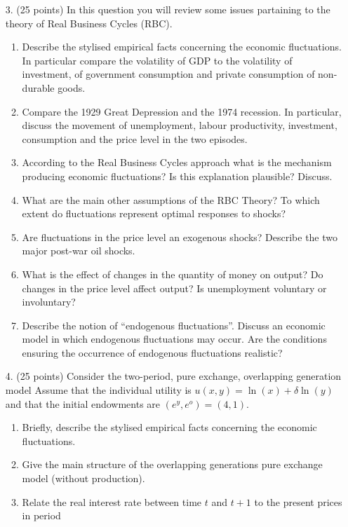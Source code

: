 \documentclass[a4paper,12pt]{article}
\begin{document}
\begin{enumerate}
\item [3.] (25 points) In this question you will review some issues
  partaining to the theory of Real Business Cycles (RBC).

\begin{enumerate}
\item Describe the stylised empirical facts concerning the economic fluctuations. In
   particular compare the volatility of GDP to the volatility of investment, of
   government consumption and private consumption of non-durable goods.
\item Compare the 1929 Great Depression and the 1974 recession. In particular, discuss
   the movement of unemployment, labour productivity, investment, consumption
   and the price level in the two episodes.
\item According to the Real Business Cycles approach what is the mechanism
   producing economic fluctuations? Is this explanation plausible? Discuss.
\item What are the main other assumptions of the RBC Theory? To which extent do
   fluctuations represent optimal responses to shocks?
\item Are fluctuations in the price level an exogenous shocks? Describe the two major
   post-war oil shocks.
\item What is the effect of changes in the quantity of money on output? Do changes in
   the price level affect output? Is unemployment voluntary or involuntary?
\item Describe the notion of ``endogenous fluctuations''. Discuss an economic model in
   which endogenous fluctuations may occur. Are the conditions ensuring the
   occurrence of endogenous fluctuations realistic?
\end{enumerate}   
%
\item [4.] (25 points) Consider the two-period, pure exchange,
  overlapping generation model Assume that the individual utility is
  $u(x,y)=\ln(x)+\delta\ln(y)$ and that the initial endowments are
  $(e^{y},e^{o})=(4,1)$.
\begin{enumerate}
\item Briefly, describe the stylised empirical facts concerning the economic fluctuations.
\item Give the main structure of the overlapping generations pure exchange model
   (without production).
\item Relate the real interest rate between time $t$ and $t+1$ to the present prices in period

\end{enumerate}
\end{enumerate}
\end{document}
